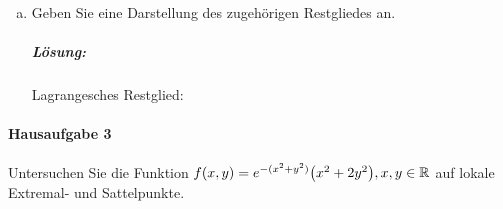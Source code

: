 \documentclass{scrreprt}
\begin{document}
\begin{enumerate}[a)]
\newpage
\item Geben Sie eine Darstellung des zugehörigen Restgliedes an.
  \subparagraph{Lösung:} Lagrangesches Restglied:
\end{enumerate}

\paragraph{Hausaufgabe 3} Untersuchen Sie die Funktion
$f(x, y) = e^{-(x^2 + y^2)}\qty(x^2 + 2y^2), x, y \in \mathbb{R}$ auf lokale
Extremal- und Sattelpunkte.
\end{document}
